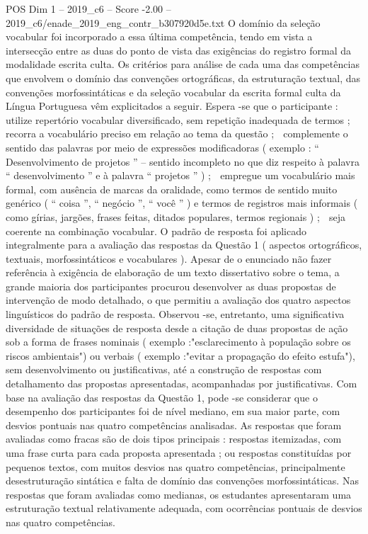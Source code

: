 \begin{textsample}{POS Dim 1 – 2019\_c6 – Score -2.00 – 2019\_c6/enade\_2019\_eng\_contr\_b307920d5e.txt}
O domínio da seleção vocabular foi incorporado a essa última competência, tendo em vista a intersecção entre as duas do ponto de vista das exigências do registro formal da modalidade escrita culta.
Os critérios para análise de cada uma das competências que envolvem o domínio das convenções ortográficas, da estruturação textual, das convenções morfossintáticas e da seleção vocabular da escrita formal culta da Língua Portuguesa vêm explicitados a seguir.
Espera -se que o participante :  utilize repertório vocabular diversificado, sem repetição inadequada de termos ;  recorra a vocabulário preciso em relação ao tema da questão ;  complemente o sentido das palavras por meio de expressões modificadoras ( exemplo : “ Desenvolvimento de projetos ” – sentido incompleto no que diz respeito à palavra “ desenvolvimento ” e à palavra “ projetos ” ) ;  empregue um vocabulário mais formal, com ausência de marcas da oralidade, como termos de sentido muito genérico ( “ coisa ”, “ negócio ”, “ você ” ) e termos de registros mais informais ( como gírias, jargões, frases feitas, ditados populares, termos regionais ) ;  seja coerente na combinação vocabular.
O padrão de resposta foi aplicado integralmente para a avaliação das respostas da Questão 1 ( aspectos ortográficos, textuais, morfossintáticos e vocabulares ).
Apesar de o enunciado não fazer referência à exigência de elaboração de um texto dissertativo sobre o tema, a grande maioria dos participantes procurou desenvolver as duas propostas de intervenção de modo detalhado, o que permitiu a avaliação dos quatro aspectos linguísticos do padrão de resposta.
Observou -se, entretanto, uma significativa diversidade de situações de resposta desde a citação de duas propostas de ação sob a forma de frases nominais ( exemplo :"esclarecimento à população sobre os riscos ambientais") ou verbais ( exemplo :"evitar a propagação do efeito estufa"), sem desenvolvimento ou justificativas, até a construção de respostas com detalhamento das propostas apresentadas, acompanhadas por justificativas.
Com base na avaliação das respostas da Questão 1, pode -se considerar que o desempenho dos participantes foi de nível mediano, em sua maior parte, com desvios pontuais nas quatro competências analisadas.
As respostas que foram avaliadas como fracas são de dois tipos principais : respostas itemizadas, com uma frase curta para cada proposta apresentada ; ou respostas constituídas por pequenos textos, com muitos desvios nas quatro competências, principalmente desestruturação sintática e falta de domínio das convenções morfossintáticas.
Nas respostas que foram avaliadas como medianas, os estudantes apresentaram uma estruturação textual relativamente adequada, com ocorrências pontuais de desvios nas quatro competências.

\end{textsample}
